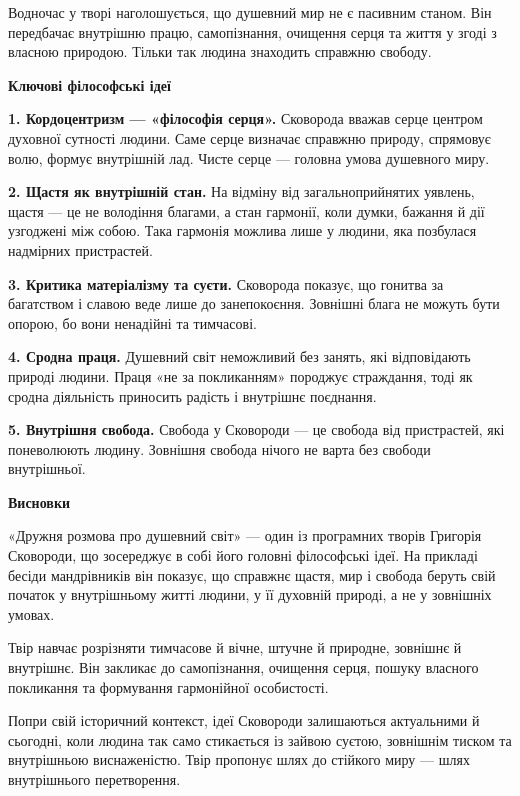 \documentclass[12pt,a4paper]{article}
\begin{document}
Водночас у творі наголошується, що душевний мир не є пасивним станом. Він передбачає внутрішню працю, самопізнання, очищення серця та життя у згоді з власною природою. Тільки так людина знаходить справжню свободу.

\vspace{1em}

\begin{center}\textbf{\large Ключові філософські ідеї}\end{center}

\textbf{1. Кордоцентризм — «філософія серця».}  
Сковорода вважав серце центром духовної сутності людини. Саме серце визначає справжню природу, спрямовує волю, формує внутрішній лад. Чисте серце — головна умова душевного миру.

\textbf{2. Щастя як внутрішній стан.}  
На відміну від загальноприйнятих уявлень, щастя — це не володіння благами, а стан гармонії, коли думки, бажання й дії узгоджені між собою. Така гармонія можлива лише у людини, яка позбулася надмірних пристрастей.

\textbf{3. Критика матеріалізму та суєти.}  
Сковорода показує, що гонитва за багатством і славою веде лише до занепокоєння. Зовнішні блага не можуть бути опорою, бо вони ненадійні та тимчасові.

\textbf{4. Сродна праця.}  
Душевний світ неможливий без занять, які відповідають природі людини. Праця «не за покликанням» породжує страждання, тоді як сродна діяльність приносить радість і внутрішнє поєднання.

\textbf{5. Внутрішня свобода.}  
Свобода у Сковороди — це свобода від пристрастей, які поневолюють людину. Зовнішня свобода нічого не варта без свободи внутрішньої.

\vspace{1em}

\begin{center}\textbf{\large Висновки}\end{center}

«Дружня розмова про душевний світ» — один із програмних творів Григорія Сковороди, що зосереджує в собі його головні філософські ідеї. На прикладі бесіди мандрівників він показує, що справжнє щастя, мир і свобода беруть свій початок у внутрішньому житті людини, у її духовній природі, а не у зовнішніх умовах.

Твір навчає розрізняти тимчасове й вічне, штучне й природне, зовнішнє й внутрішнє. Він закликає до самопізнання, очищення серця, пошуку власного покликання та формування гармонійної особистості.

Попри свій історичний контекст, ідеї Сковороди залишаються актуальними й сьогодні, коли людина так само стикається із зайвою суєтою, зовнішнім тиском та внутрішньою виснаженістю. Твір пропонує шлях до стійкого миру — шлях внутрішнього перетворення.
\end{document}

